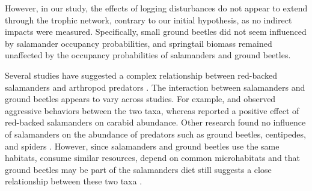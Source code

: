 However, in our study, the effects of logging disturbances do not appear to extend through the trophic network, contrary to our initial hypothesis, as no indirect impacts were measured.
Specifically, small ground beetles did not seem influenced by salamander occupancy probabilities, and springtail biomass remained unaffected by the occupancy probabilities of salamanders and ground beetles.

Several studies have suggested a complex relationship between red-backed salamanders and arthropod predators \citep{Gall2003BehavioralInteractions,Walton2006Salamandersforestfloor,Hickerson2018Behavioralinteractions}. 
The interaction between salamanders and ground beetles appears to vary across studies.  
For example, \cite{Gall2003BehavioralInteractions} and \cite{Ovaska1988Predatorybehavior} observed aggressive behaviors between the two taxa, whereas \cite{Hickerson2012Interactionsforestfloor} reported a positive effect of red-backed salamanders on carabid abundance. 
Other research found no influence of salamanders on the abundance of predators such as ground beetles, centipedes, and spiders \citep{Hocking2013Effectsexperimental}. 
However, since salamanders and ground beetles use the same habitats, consume similar resources, depend on common microhabitats and that ground beetles may be part of the salamanders diet still suggests a close relationship between these two taxa \citep{Jaeger1980Microhabitatsterrestrial,Lovei1996Ecologybehavior}.

